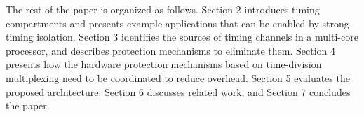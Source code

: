 The rest of the paper is organized as follows.
Section 2 introduces timing compartments and 
presents example applications that can be enabled by strong timing isolation.
Section 3 identifies the sources of timing channels in a multi-core processor, and
describes protection mechanisms to eliminate them. 
Section 4 presents how the hardware protection mechanisms based on time-division
multiplexing need to be coordinated to reduce overhead.
Section 5 evaluates the proposed architecture. Section 6 discusses related
work, and Section 7 concludes the paper.
